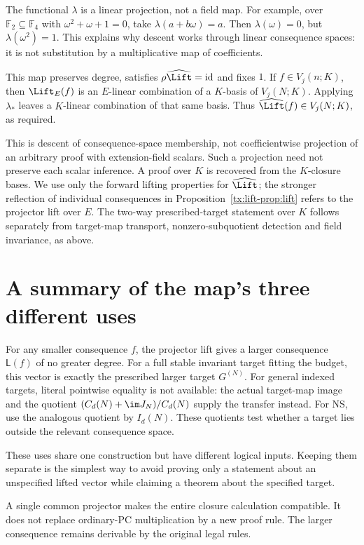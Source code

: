 The functional $\lambda$ is a linear projection, not a field map.
For example, over $\mathbb F_2\subseteq\mathbb F_4$ with
$\omega^2+\omega+1=0$, take $\lambda(a+b\omega)=a$.
Then $\lambda(\omega)=0$, but $\lambda(\omega^2)=1$.
This explains why descent works through linear consequence spaces:
it is not substitution by a multiplicative map of coefficients.

This map preserves degree, satisfies $\rho\widehat\Lift=\mathrm{id}$
and fixes $1$. If $f\in V_j(n;K)$, then $\Lift_E(f)$ is an
$E$-linear combination of a $K$-basis of $V_j(N;K)$. Applying
$\lambda_*$ leaves a $K$-linear combination of that same basis.
Thus $\widehat\Lift(f)\in V_j(N;K)$, as required.

This is descent of consequence-space membership, not coefficientwise
projection of an arbitrary proof with extension-field scalars. Such a
projection need not preserve each scalar inference. A proof over $K$
is recovered from the $K$-closure bases. We use only the forward lifting
properties for $\widehat\Lift$; the stronger reflection of individual
consequences in Proposition~\ref{tx:lift-prop:lift} refers to the projector lift
over $E$. The two-way prescribed-target statement over $K$ follows separately
from target-map transport, nonzero-subquotient detection and field
invariance, as above.


\section{A summary of the map's three different uses}
For any smaller consequence $f$, the projector lift gives a larger
consequence $\mathsf L(f)$ of no greater degree. For a full stable
invariant target fitting the budget, this vector is exactly the
prescribed larger target $G^{(N)}$. For general indexed targets, literal
pointwise equality is not available: the actual target-map image and
the quotient $(C_d(N)+\im J_N)/C_d(N)$ supply the transfer instead.
For NS, use the analogous quotient by $I_d(N)$. These quotients test
whether a target lies outside the relevant consequence space.

These uses share one construction but have different logical inputs.
Keeping them separate is the simplest way to avoid proving only a
statement about an unspecified lifted vector while claiming a theorem
about the specified target.

\begin{checkpoint}
A single common projector makes the entire closure calculation compatible.
It does not replace ordinary-PC multiplication by a new proof rule.
The larger consequence remains derivable by the original legal rules.
\end{checkpoint}
